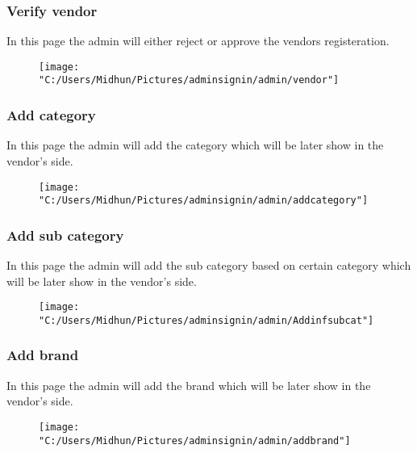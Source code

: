 \documentclass{beamer}
\begin{document}
\begin{frame}
\subsubsection{Verify vendor}
In this page the admin will either reject or approve the vendors registeration.
\begin{figure}[bph]
	\centering
	\texttt{[image: "C:/Users/Midhun/Pictures/adminsignin/admin/vendor"]}
	\label{fig:admin-signin}
\end{figure}

\end{frame}

\begin{frame}

\subsubsection{Add category}
In this page the admin will add the category which will be later show in the vendor's side.
\begin{figure}[bph]
	\centering
	\texttt{[image: "C:/Users/Midhun/Pictures/adminsignin/admin/addcategory"]}
	\label{fig:admin-signin}
\end{figure}
\end{frame}

\begin{frame}

\subsubsection{Add sub category}
In this page the admin will add the sub category based on certain category which will be later show in the vendor's side.
\begin{figure}[bph]
	\centering
	\texttt{[image: "C:/Users/Midhun/Pictures/adminsignin/admin/Addinfsubcat"]}
	\label{fig:admin-signin}
\end{figure}
\end{frame}

\begin{frame}

\subsubsection{Add brand}
In this page the admin will add the brand which will be later show in the vendor's side.
\begin{figure}[bph]
	\centering
	\texttt{[image: "C:/Users/Midhun/Pictures/adminsignin/admin/addbrand"]}
	\label{fig:admin-signin}
\end{figure}
\end{frame}
\end{document}
